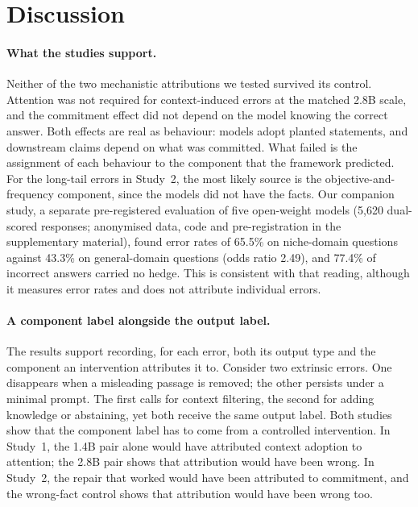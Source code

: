 \documentclass[10pt]{article}
\begin{document}
\section{Discussion}
\label{sec:discussion}

\paragraph{What the studies support.} Neither of the two mechanistic attributions we tested survived its control. Attention was not required for context-induced errors at the matched 2.8B scale, and the commitment effect did not depend on the model knowing the correct answer. Both effects are real as behaviour: models adopt planted statements, and downstream claims depend on what was committed. What failed is the assignment of each behaviour to the component that the framework predicted. For the long-tail errors in Study~2, the most likely source is the objective-and-frequency component, since the models did not have the facts. Our companion study, a separate pre-registered evaluation of five open-weight models (5{,}620 dual-scored responses; anonymised data, code and pre-registration in the supplementary material), found error rates of 65.5\% on niche-domain questions against 43.3\% on general-domain questions (odds ratio 2.49), and 77.4\% of incorrect answers carried no hedge. This is consistent with that reading, although it measures error rates and does not attribute individual errors.

\paragraph{A component label alongside the output label.} The results support recording, for each error, both its output type and the component an intervention attributes it to. Consider two extrinsic errors. One disappears when a misleading passage is removed; the other persists under a minimal prompt. The first calls for context filtering, the second for adding knowledge or abstaining, yet both receive the same output label. Both studies show that the component label has to come from a controlled intervention. In Study~1, the 1.4B pair alone would have attributed context adoption to attention; the 2.8B pair shows that attribution would have been wrong. In Study~2, the repair that worked would have been attributed to commitment, and the wrong-fact control shows that attribution would have been wrong too.
\end{document}
